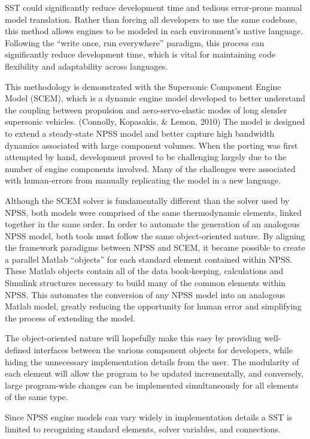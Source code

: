 \documentclass[heading.tex]{subfiles}
\begin{document}
SST could significantly reduce development time and tedious error-prone manual model translation.
Rather than forcing all developers to use the same codebase,
this method allows engines to be modeled in each environment's native language.
Following the ``write once, run everywhere'' paradigm,
this process can significantly reduce development time,
which is vital for maintaining code flexibility and adaptability across languages.

This methodology is demonstrated with the Supersonic Component Engine Model (SCEM), which is a dynamic engine model
developed to better understand the coupling between propulsion and  aero-servo-elastic modes of long slender
supersonic vehicles. (Connolly, Kopasakis, \& Lemon, 2010)
The model is designed to extend a steady-state NPSS model
and better capture high bandwidth dynamics associated with large component volumes. 
When the porting was first attempted by hand, 
development proved to be challenging largely due to the number of engine components involved.
Many of the challenges were associated with human-errors from manually replicating the model in a new language. 

Although the SCEM solver is fundamentally different than the solver used by NPSS,
both models were comprised of the same thermodynamic elements, linked together in the same order. 
In order to automate the generation of an analogous NPSS model,
both tools must follow the same object-oriented nature.
By aligning the framework paradigms between NPSS and SCEM,
it became possible to create a parallel Matlab “objects” for each standard element contained within NPSS.
These Matlab objects contain all of the data book-keeping,
calculations and Simulink structures necessary to build many of the common elements within NPSS.
This automates the conversion of any NPSS model into an analogous Matlab model,
greatly reducing the opportunity for human error and simplifying the process of extending the model.


The object-oriented nature will hopefully make this easy
by providing well-defined interfaces between the various component objects for developers, while
hiding the unnecessary implementation details from the user. The modularity of each element will
allow the program to be updated incrementally, and conversely, large program-wide changes can be
implemented simultaneously for all elements of the same type. 

Since NPSS engine models can vary widely in implementation details a SST is limited to recognizing
standard elements, solver variables, and connections. 
\end{document}
